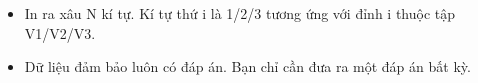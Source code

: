 \begin{itemize}
	\item     In ra xâu N kí tự. Kí tự thứ i là 1/2/3 tương ứng với đỉnh i thuộc tập V1/V2/V3.   
	\item     Dữ liệu đảm bảo luôn có đáp án. Bạn chỉ cần đưa ra một đáp án bất kỳ.   
\end{itemize}

\